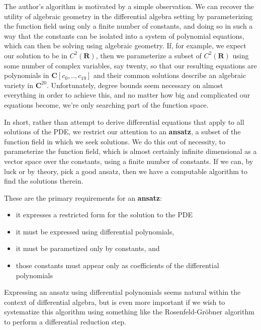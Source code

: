 \documentclass{article}
\begin{document}
The author's algorithm is motivated by a simple observation.  We can recover the
utility of algebraic geometry in the differential algebra setting by parameterizing
the function field using only a finite number of constants, and doing so in such
a way that the constants can be isolated into a system of polynomial equations,
which can then be solving using algebraic geometry.  If, for example, we expect
our solution to be in $C^2(\mathbf{R})$, then we parameterize a subset of
$C^2(\mathbf{R})$ using some number of complex variables, say twenty, so that our resulting
equations are polynomials in $\mathbf{C}[c_0,..,c_{19}]$ and their common
solutions describe an algebraic variety in $\mathbf{C}^{20}$.
Unfortunately, degree bounds seem necessary on almost everything in order
to achieve this, and no matter how big and complicated our equations become,
we're only searching part of the function space.

In short, rather than attempt to derive differential equations that apply to all solutions
of the PDE, we restrict our attention to an {\bf ansatz}, a subset of the function
field in which we seek solutions.  We do this out of necessity, to parameterize
the function field, which is almost certainly infinite dimensional as a vector space over the constants,
using a finite number of constants.
If we can, by luck or by theory, pick a good ansatz, then we have
a computable algorithm to find the solutions therein.


These are the primary requirements
for an {\bf ansatz}:

\begin{itemize}
\item it expresses a restricted form for the solution to the PDE
\item it must be expressed using differential polynomials,
\item it must be parametized only by constants, and
\item those constants must appear only as coefficients of the differential polynomials
\end{itemize}

Expressing an ansatz using differential polynomials seems natural within the context of differential algebra,
but is even more important if we wish to systematize this algorithm using
something like the Rosenfeld-Gr\"obner algorithm to perform a differential reduction step.
\end{document}
